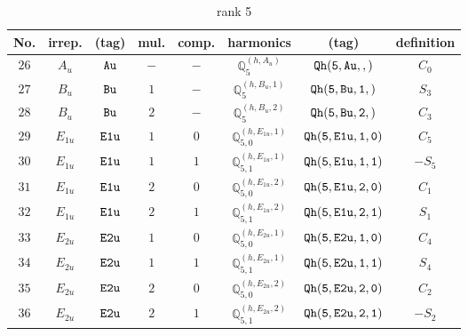 \documentclass[fleqn,8pt]{jsarticle}
\begin{document}
\begin{table}[ht!]
\begin{center}
\caption{rank 5}
\renewcommand{\arraystretch}{1.3}
\begin{tabular}{cccccccc} \hline \hline
No. & irrep. & (tag) & mul. & comp. & harmonics & (tag) & definition \\ \hline
$ 26 $ & $ A_{u} $ & $ {\tt Au} $ & $ - $ & $ - $ & $ \mathbb{Q}_{5}^{(h,A_{u})} $ & $ {\tt Qh(5,Au,,)} $ & $ C_{0} $ \\
$ 27 $ & $ B_{u} $ & $ {\tt Bu} $ & $ 1 $ & $ - $ & $ \mathbb{Q}_{5}^{(h,B_{u},1)} $ & $ {\tt Qh(5,Bu,1,)} $ & $ S_{3} $ \\
$ 28 $ & $ B_{u} $ & $ {\tt Bu} $ & $ 2 $ & $ - $ & $ \mathbb{Q}_{5}^{(h,B_{u},2)} $ & $ {\tt Qh(5,Bu,2,)} $ & $ C_{3} $ \\
$ 29 $ & $ E_{1u} $ & $ {\tt E1u} $ & $ 1 $ & $ 0 $ & $ \mathbb{Q}_{5,0}^{(h,E_{1u},1)} $ & $ {\tt Qh(5,E1u,1,0)} $ & $ C_{5} $ \\
$ 30 $ & $ E_{1u} $ & $ {\tt E1u} $ & $ 1 $ & $ 1 $ & $ \mathbb{Q}_{5,1}^{(h,E_{1u},1)} $ & $ {\tt Qh(5,E1u,1,1)} $ & $ - S_{5} $ \\
$ 31 $ & $ E_{1u} $ & $ {\tt E1u} $ & $ 2 $ & $ 0 $ & $ \mathbb{Q}_{5,0}^{(h,E_{1u},2)} $ & $ {\tt Qh(5,E1u,2,0)} $ & $ C_{1} $ \\
$ 32 $ & $ E_{1u} $ & $ {\tt E1u} $ & $ 2 $ & $ 1 $ & $ \mathbb{Q}_{5,1}^{(h,E_{1u},2)} $ & $ {\tt Qh(5,E1u,2,1)} $ & $ S_{1} $ \\
$ 33 $ & $ E_{2u} $ & $ {\tt E2u} $ & $ 1 $ & $ 0 $ & $ \mathbb{Q}_{5,0}^{(h,E_{2u},1)} $ & $ {\tt Qh(5,E2u,1,0)} $ & $ C_{4} $ \\
$ 34 $ & $ E_{2u} $ & $ {\tt E2u} $ & $ 1 $ & $ 1 $ & $ \mathbb{Q}_{5,1}^{(h,E_{2u},1)} $ & $ {\tt Qh(5,E2u,1,1)} $ & $ S_{4} $ \\
$ 35 $ & $ E_{2u} $ & $ {\tt E2u} $ & $ 2 $ & $ 0 $ & $ \mathbb{Q}_{5,0}^{(h,E_{2u},2)} $ & $ {\tt Qh(5,E2u,2,0)} $ & $ C_{2} $ \\
$ 36 $ & $ E_{2u} $ & $ {\tt E2u} $ & $ 2 $ & $ 1 $ & $ \mathbb{Q}_{5,1}^{(h,E_{2u},2)} $ & $ {\tt Qh(5,E2u,2,1)} $ & $ - S_{2} $ \\
 \hline \hline
\end{tabular}
\end{center}
\end{table}
\end{document}
